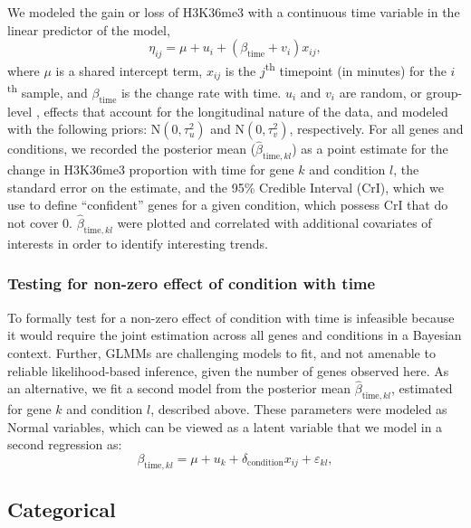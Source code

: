 \documentclass[12pt]{extarticle}
\begin{document}
We modeled the gain or loss of H3K36me3 with a continuous time variable in the linear predictor of the model, 
\begin{equation}
	\eta_{ij} = \mu + u_{i} + (\beta_{\text{time}} + v_{i})x_{ij},
\end{equation}
where $\mu$ is a shared intercept term, $x_{ij}$ is the $j$\textsuperscript{th} timepoint (in minutes) for the $i$\textsuperscript{th} sample, and $\beta_{\text{time}}$ is the change rate with time. $u_{i}$ and $v_{i}$ are random, or group-level \cite{Gelman2006}, effects that account for the longitudinal nature of the data, and modeled with the following priors: $\text{N}(0, \tau^{2}_{u})$ and $\text{N}(0, \tau^{2}_{v})$, respectively. For all genes and conditions, we recorded the posterior mean ($\widehat{\beta}_{\text{time}, kl}$) as a point estimate for the change in H3K36me3 proportion with time for gene $k$ and condition $l$, the standard error on the estimate, and the 95\% Credible Interval (CrI), which we use to define ``confident'' genes for a given condition, which possess CrI that do not cover 0. $\widehat{\beta}_{\text{time}, kl}$ were plotted and correlated with additional covariates of interests in order to identify interesting trends.

\subsubsection*{Testing for non-zero effect of condition with time}

To formally test for a non-zero effect of condition with time is infeasible because it would require the joint estimation across all genes and conditions in a Bayesian context. Further, GLMMs are challenging models to fit, and not amenable to reliable likelihood-based inference, given the number of genes observed here. As an alternative, we fit a second model from the posterior mean $\widehat{\beta}_{\text{time}, kl}$, estimated for gene $k$ and condition $l$, described above. These parameters were modeled as Normal variables, which can be viewed as a latent variable that we model in a second regression as:
\begin{equation}
	\beta_{\text{time}, kl} = \mu + u_{k} + \delta_{\text{condition}}x_{ij} + \varepsilon_{kl},
\end{equation}

\subsection*{Categorical}
\end{document}
